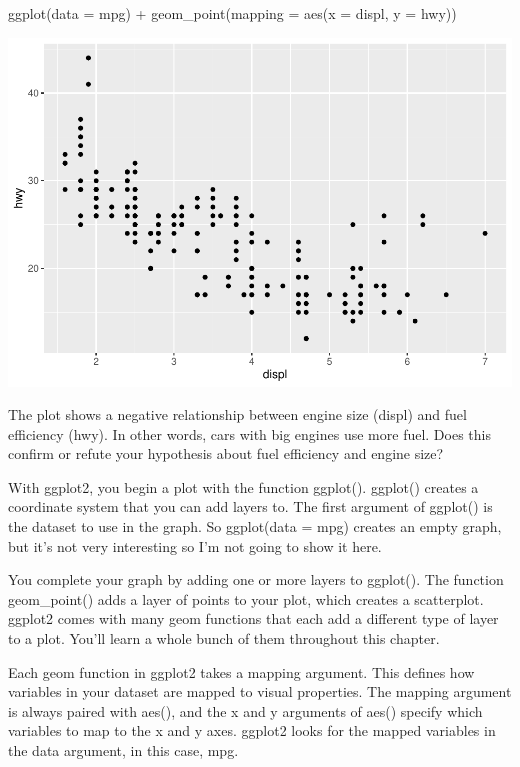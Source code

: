\documentclass[
]{article}
\newenvironment{Shaded}{\begin{snugshade}}{\end{snugshade}}
\newcommand{\AttributeTok}[1]{\textcolor[rgb]{0.77,0.63,0.00}{#1}}
\newcommand{\FunctionTok}[1]{\textcolor[rgb]{0.00,0.00,0.00}{#1}}
\newcommand{\NormalTok}[1]{#1}
\newcommand{\SpecialCharTok}[1]{\textcolor[rgb]{0.00,0.00,0.00}{#1}}
\begin{document}
\begin{Shaded}
\begin{Highlighting}[]
\FunctionTok{ggplot}\NormalTok{(}\AttributeTok{data =}\NormalTok{ mpg) }\SpecialCharTok{+} 
  \FunctionTok{geom\_point}\NormalTok{(}\AttributeTok{mapping =} \FunctionTok{aes}\NormalTok{(}\AttributeTok{x =}\NormalTok{ displ, }\AttributeTok{y =}\NormalTok{ hwy))}
\end{Highlighting}
\end{Shaded}

\includegraphics{Journal_files/figure-latex/unnamed-chunk-37-1.pdf}

The plot shows a negative relationship between engine size (displ) and
fuel efficiency (hwy). In other words, cars with big engines use more
fuel. Does this confirm or refute your hypothesis about fuel efficiency
and engine size?

With ggplot2, you begin a plot with the function ggplot(). ggplot()
creates a coordinate system that you can add layers to. The first
argument of ggplot() is the dataset to use in the graph. So ggplot(data
= mpg) creates an empty graph, but it's not very interesting so I'm not
going to show it here.

You complete your graph by adding one or more layers to ggplot(). The
function geom\_point() adds a layer of points to your plot, which
creates a scatterplot. ggplot2 comes with many geom functions that each
add a different type of layer to a plot. You'll learn a whole bunch of
them throughout this chapter.

Each geom function in ggplot2 takes a mapping argument. This defines how
variables in your dataset are mapped to visual properties. The mapping
argument is always paired with aes(), and the x and y arguments of aes()
specify which variables to map to the x and y axes. ggplot2 looks for
the mapped variables in the data argument, in this case, mpg.
\end{document}
